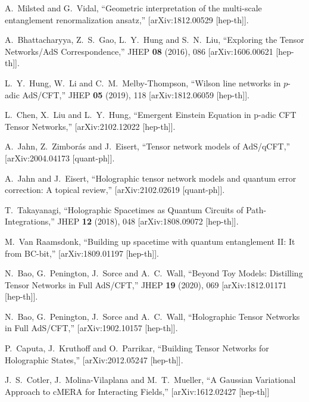 \documentclass[a4paper,12pt]{article}
\begin{document}
\begin{thebibliography}{}
A.~Milsted and G.~Vidal,
``Geometric interpretation of the multi-scale entanglement renormalization ansatz,''
[arXiv:1812.00529 [hep-th]].

A.~Bhattacharyya, Z.~S.~Gao, L.~Y.~Hung and S.~N.~Liu,
``Exploring the Tensor Networks/AdS Correspondence,''
JHEP \textbf{08} (2016), 086
[arXiv:1606.00621 [hep-th]].

L.~Y.~Hung, W.~Li and C.~M.~Melby-Thompson,
``Wilson line networks in $p$-adic AdS/CFT,''
JHEP \textbf{05} (2019), 118
[arXiv:1812.06059 [hep-th]].

L.~Chen, X.~Liu and L.~Y.~Hung,
``Emergent Einstein Equation in p-adic CFT Tensor Networks,''
[arXiv:2102.12022 [hep-th]].

A.~Jahn, Z.~Zimbor\'as and J.~Eisert,
``Tensor network models of AdS/qCFT,''
[arXiv:2004.04173 [quant-ph]].

A.~Jahn and J.~Eisert,
``Holographic tensor network models and quantum error correction: A topical review,''
[arXiv:2102.02619 [quant-ph]].

T.~Takayanagi,
``Holographic Spacetimes as Quantum Circuits of Path-Integrations,''
JHEP \textbf{12} (2018), 048
[arXiv:1808.09072 [hep-th]].

M.~Van Raamsdonk,
``Building up spacetime with quantum entanglement II: It from BC-bit,''
[arXiv:1809.01197 [hep-th]].

N.~Bao, G.~Penington, J.~Sorce and A.~C.~Wall,
``Beyond Toy Models: Distilling Tensor Networks in Full AdS/CFT,''
JHEP \textbf{19} (2020), 069
[arXiv:1812.01171 [hep-th]].

N.~Bao, G.~Penington, J.~Sorce and A.~C.~Wall,
``Holographic Tensor Networks in Full AdS/CFT,''
[arXiv:1902.10157 [hep-th]].

P.~Caputa, J.~Kruthoff and O.~Parrikar,
``Building Tensor Networks for Holographic States,''
[arXiv:2012.05247 [hep-th]].

J.~S.~Cotler, J.~Molina-Vilaplana and M.~T.~Mueller,
``A Gaussian Variational Approach to cMERA for Interacting Fields,''
[arXiv:1612.02427 [hep-th]]


\end{thebibliography}
\end{document}
